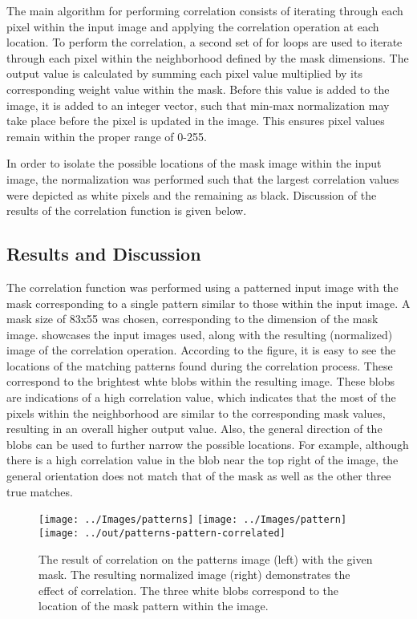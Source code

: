 \documentclass[headings=optiontoheadandtoc,listof=totoc,parskip=full]{scrartcl}
\begin{document}
The main algorithm for performing correlation consists of iterating through each pixel within the input image and applying the correlation operation at each location. To perform the correlation, a  second set of for loops are used to iterate through each pixel within the neighborhood defined by the mask dimensions. The output value is calculated by summing each pixel value multiplied by its corresponding weight value within the mask. Before this value is added to the image, it is added to an integer vector, such that min-max normalization may take place before the pixel is updated in the image. This ensures pixel values remain within the proper range of 0-255.

In order to isolate the possible locations of the mask image within the input image, the normalization was performed such that the largest correlation values were depicted as white pixels and the remaining as black. Discussion of the results of the correlation function is given below.



\subsection{Results and Discussion}

The correlation function was performed using a patterned input image with the mask corresponding to a single pattern similar to those within the input image. A mask size of 83x55 was chosen, corresponding to the dimension of the mask image.  showcases the input images used, along with the resulting (normalized)  image of the correlation operation. According to the figure, it is easy to see the locations of the matching patterns found during the correlation process. These correspond to the brightest whte blobs within the resulting image. These blobs are indications of a high correlation value, which indicates that the most of the pixels within the neighborhood are similar to the corresponding mask values, resulting in an overall higher output value. Also, the general direction of the blobs can be used to further narrow the possible locations. For example, although there is a high correlation value in the blob near the top right of the image, the general orientation does not match that of the mask as well as the other three true matches.


\begin{figure}[H]
	\centering
	\texttt{[image: ../Images/patterns]}
	\texttt{[image: ../Images/pattern]}
	\texttt{[image: ../out/patterns-pattern-correlated]}
	\caption{The result of correlation on the patterns image (left) with the given mask. The resulting normalized image (right) demonstrates the effect of correlation. The three white blobs correspond to the location of the mask pattern within the image.}
	\label{fig:correlation-result-1}
\end{figure}
\end{document}
